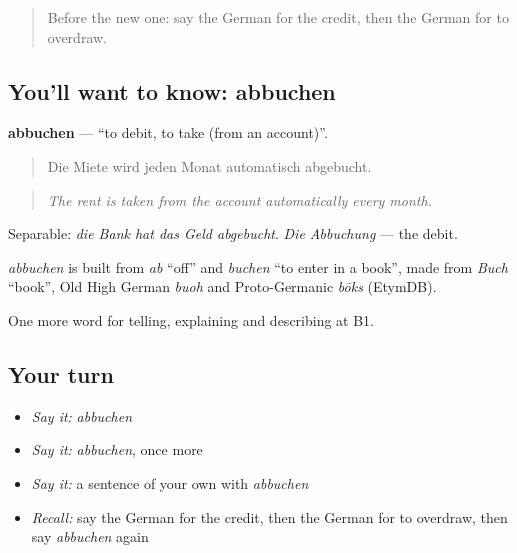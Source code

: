 \label{lesson:GE-C387-abbuchen}



\begin{quote}
Before the new one: say the German for the credit, then the German for to overdraw.
\end{quote}

\subsection*{You'll want to know: abbuchen}
\textbf{abbuchen} — \textquotedblleft{}to debit, to take (from an account)\textquotedblright{}.

\begin{quote}
Die Miete wird jeden Monat automatisch abgebucht.
\end{quote}

\begin{quote}
\emph{The rent is taken from the account automatically every month.}
\end{quote}

Separable: \emph{die Bank hat das Geld abgebucht}. \emph{Die Abbuchung} — the debit.

\begin{cousinweb}
\emph{abbuchen} is built from \emph{ab} \textquotedblleft{}off\textquotedblright{} and \emph{buchen} \textquotedblleft{}to enter in a book\textquotedblright{}, made from \emph{Buch} \textquotedblleft{}book\textquotedblright{}, Old High German \emph{buoh} and Proto-Germanic \emph{bōks} (EtymDB).
\end{cousinweb}

\begin{grammarlens}[title={What you've built}]
One more word for telling, explaining and describing at B1.
\end{grammarlens}

\subsection*{Your turn}
\begin{itemize}
\raggedright
  \item \emph{Say it:} \emph{abbuchen}
  \item \emph{Say it:} \emph{abbuchen}, once more
  \item \emph{Say it:} a sentence of your own with \emph{abbuchen}
  \item \emph{Recall:} say the German for the credit, then the German for to overdraw, then say \emph{abbuchen} again
\end{itemize}

